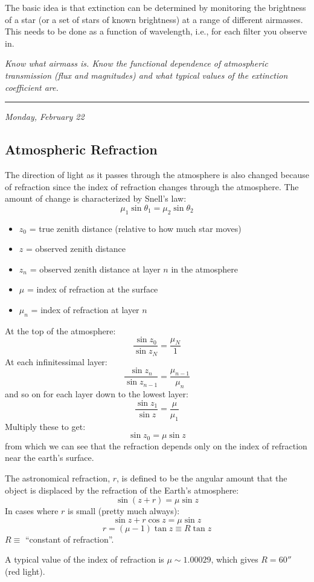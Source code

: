 \documentclass[12pt]{article}
\newcommand{\test}[1]{%
    \begin{center}
        {\parbox{0.9\textwidth}{\textit{\small#1}}}
    \end{center}}
\newcommand{\mydate}[1]{
    \begin{flushright}
        \rule{\textwidth}{0.4pt} %
        \footnotesize\hfill\textit{#1}
    \end{flushright}}
\begin{document}
The basic idea is that extinction can be determined by monitoring the
brightness of a star (or a set of stars of known brightness) at a range of
different airmasses. This needs to be done as a function of wavelength, i.e.,
for each filter you observe in.

\test{Know what airmass is. Know the functional dependence of atmospheric
transmission (flux and magnitudes) and what typical values of the extinction
coefficient are.}

\mydate{Monday, February 22}
\subsection{Atmospheric Refraction}
The direction of light as it passes through the atmosphere is also changed
because of refraction since the index of refraction changes through the
atmosphere. The amount of change is characterized by Snell's law:
\[
     \mu_{1}\sin\theta_{1} = \mu_{2}\sin\theta_{2}
     \]
\begin{itemize}
    \item $z_{0}$ = true zenith distance (relative to how much star moves)
    \item $z$ = observed zenith distance
    \item $z_{n}$ = observed zenith distance at layer $n$ in the
        atmosphere
    \item $\mu$ = index of refraction at the surface
    \item $\mu_{n}$ = index of refraction at layer $n$
\end{itemize}
At the top of the atmosphere:
\[
     \frac{\sin z_{0}}{\sin z_{N}} = \frac{\mu_{N}}{1}
     \]
At each infinitessimal layer:
\[
     \frac{\sin z_{n}}{\sin z_{n-1}} = \frac{\mu_{n-1}}{\mu_{n}}
     \]
and so on for each layer down to the lowest layer:
\[
     \frac{\sin z_{1}}{\sin z} = \frac{\mu}{\mu_{1}}
     \]
Multiply these to get:
\[
     \sin z_{0} = \mu\sin z
     \]
from which we can see that the refraction depends
only on the index of refraction near the earth's surface.

The astronomical refraction, $r$, is defined to be the angular amount that
the object is displaced by the refraction of the Earth's atmosphere:
\[
    \sin(z+r) = \mu\sin{z}
    \]
In cases where $r$ is small (pretty much always):
\[
    \sin{z} + r\cos{z} = \mu\sin{z}
    \]
\[
    r = (\mu-1) \tan{z} \equiv R\tan{z}
    \]
$R \equiv$ ``constant of refraction''.

A typical value of the index of refraction is $\mu \sim 1.00029$, which
gives $R = 60''$ (red light).
\end{document}
